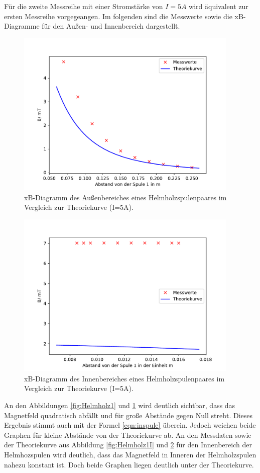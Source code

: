 \noindent Für die zweite Messreihe mit einer Stromstärke
von $I=5A$ wird äquivalent zur ersten Messreihe
vorgegeangen. Im folgenden sind die Messwerte sowie
die xB-Diagramme für den Außen- und Innenbereich
dargestellt.


\begin{figure}[H]
  \centering
  \includegraphics[height=8cm]{Helmholz2.pdf}
  \caption{xB-Diagramm des Außenbereiches eines
  Helmholzspulenpaares im Vergleich zur Theoriekurve
  (I=5A).}
  \label{fig:Helmholz2}
\end{figure}

\begin{figure}[H]
  \centering
  \includegraphics[height=8cm]{Helmholz2I.pdf}
  \caption{xB-Diagramm des Innenbereiches eines
  Helmholzspulenpaares im Vergleich zur Theoriekurve
  (I=5A).}
  \label{fig:Helmholz2I}
\end{figure}
\noindent An den Abbildungen \ref{fig:Helmholz1}
und \ref{fig:Helmholz2} wird deutlich sichtbar, dass
das Magnetfeld quadratisch abfällt und für große Abstände
gegen Null strebt. Dieses Ergebnis stimmt auch mit
der Formel \ref{eqn:inspule} überein. Jedoch weichen beide
Graphen für kleine Abstände von der Theoriekurve ab.
\noindent An den Messdaten sowie der Theoriekurve aus
Abbildung \ref{fig:Helmholz1I} und \ref{fig:Helmholz2I}
für den Innenbereich der Helmhozspulen wird deutlich, dass
das Magnetfeld in Inneren der Helmholzspulen
nahezu konstant ist. Doch beide Graphen liegen
deutlich unter der Theoriekurve.


